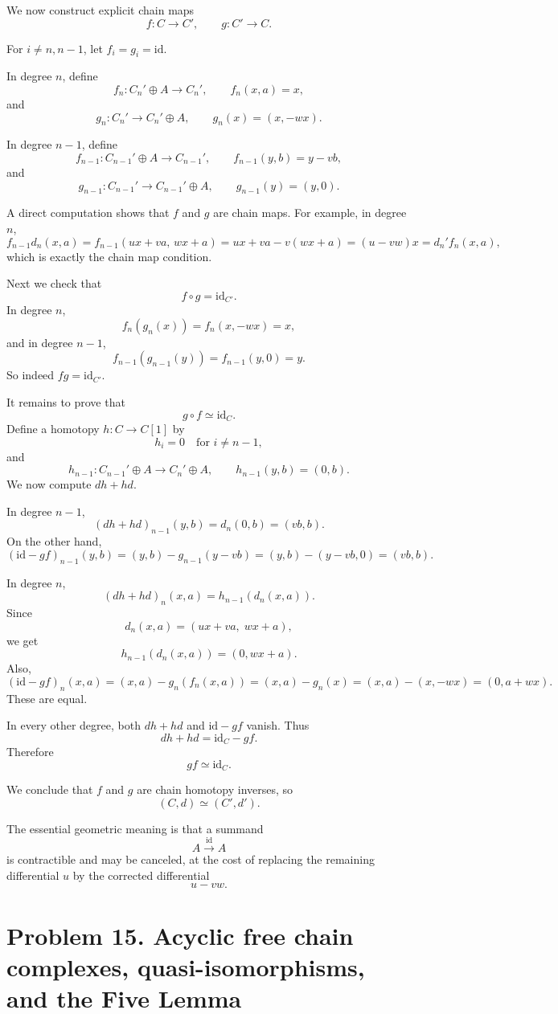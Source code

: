 \documentclass[12pt,a4paper]{article}
\theoremstyle{notespace}
\begin{document}
We now construct explicit chain maps
\[
f:C\to C',
\qquad
g:C'\to C.
\]

For \(i\neq n,n-1\), let \(f_i=g_i=\mathrm{id}\).

In degree \(n\), define
\[
f_n:C_n'\oplus A\to C_n',
\qquad
f_n(x,a)=x,
\]
and
\[
g_n:C_n'\to C_n'\oplus A,
\qquad
g_n(x)=(x,-wx).
\]

In degree \(n-1\), define
\[
f_{n-1}:C_{n-1}'\oplus A\to C_{n-1}',
\qquad
f_{n-1}(y,b)=y-vb,
\]
and
\[
g_{n-1}:C_{n-1}'\to C_{n-1}'\oplus A,
\qquad
g_{n-1}(y)=(y,0).
\]

A direct computation shows that \(f\) and \(g\) are chain maps. For example, in degree \(n\),
\[
f_{n-1}d_n(x,a)
=
f_{n-1}(ux+va,\,wx+a)
=
ux+va-v(wx+a)
=
(u-vw)x
=
d_n' f_n(x,a),
\]
which is exactly the chain map condition.

Next we check that
\[
f\circ g=\mathrm{id}_{C'}.
\]
In degree \(n\),
\[
f_n(g_n(x))=f_n(x,-wx)=x,
\]
and in degree \(n-1\),
\[
f_{n-1}(g_{n-1}(y))=f_{n-1}(y,0)=y.
\]
So indeed \(fg=\mathrm{id}_{C'}\).

It remains to prove that
\[
g\circ f \simeq \mathrm{id}_C.
\]
Define a homotopy \(h:C\to C[1]\) by
\[
h_i=0 \quad \text{for } i\neq n-1,
\]
and
\[
h_{n-1}:C_{n-1}'\oplus A\to C_n'\oplus A,
\qquad
h_{n-1}(y,b)=(0,b).
\]
We now compute \(dh+hd\).

In degree \(n-1\),
\[
(dh+hd)_{n-1}(y,b)=d_n(0,b)=(vb,b).
\]
On the other hand,
\[
(\mathrm{id}-gf)_{n-1}(y,b)
=
(y,b)-g_{n-1}(y-vb)
=
(y,b)-(y-vb,0)
=
(vb,b).
\]

In degree \(n\),
\[
(dh+hd)_n(x,a)=h_{n-1}(d_n(x,a)).
\]
Since
\[
d_n(x,a)=(ux+va,\;wx+a),
\]
we get
\[
h_{n-1}(d_n(x,a))=(0,wx+a).
\]
Also,
\[
(\mathrm{id}-gf)_n(x,a)
=
(x,a)-g_n(f_n(x,a))
=
(x,a)-g_n(x)
=
(x,a)-(x,-wx)
=
(0,a+wx).
\]
These are equal.

In every other degree, both \(dh+hd\) and \(\mathrm{id}-gf\) vanish. Thus
\[
dh+hd=\mathrm{id}_C-gf.
\]
Therefore
\[
gf\simeq \mathrm{id}_C.
\]

We conclude that \(f\) and \(g\) are chain homotopy inverses, so
\[
\boxed{(C,d)\simeq (C',d').}
\]

\medskip

The essential geometric meaning is that a summand
\[
A\xrightarrow{\mathrm{id}}A
\]
is contractible and may be canceled, at the cost of replacing the remaining differential \(u\) by the corrected differential
\[
u-vw.
\]



\section{Problem 15. Acyclic free chain complexes, quasi-isomorphisms, and the Five Lemma}
\end{document}
